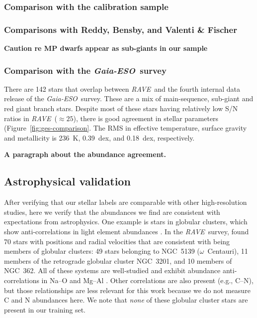 \documentclass[preprint,trackchanges]{aastex}
\newcommand{\acronym}[1]{{\small{#1}}}
\newcommand{\project}[1]{\textsl{#1}}
\newcommand{\rave}{\project{\acronym{RAVE}}}
\newcommand{\ges}{\project{Gaia-ESO}}
\newcommand{\stub}[1]{{\color{blue} \textbf{#1}}}
\begin{document}
\subsubsection{Comparison with the \citet{Kordopatis_2013} calibration sample}
\label{sec:validation-kordopatis}

\subsubsection{Comparisons with Reddy, Bensby, and Valenti \& Fischer}
\label{sec:validation-gold-standards}

\stub{Caution re MP dwarfs appear as sub-giants in our sample}

\subsubsection{Comparison with the \ges\ survey}
\label{sec:validation-ges}

There are 142 stars that overlap between \rave\ and the fourth internal
data release of the \ges\ survey. These are a mix of main-sequence, 
sub-giant and red giant branch stars.  Despite most of these stars having
relatively low S/N ratios in \rave\ ($\approx 25$), there is good 
agreement in stellar parameters (Figure~\ref{fig:ges-comparison}.  
The RMS in effective temperature, surface gravity and metallicity is
236~K, 0.39~dex, and 0.18~dex, respectively. 

\stub{A paragraph about the abundance agreement.}



\subsection{Astrophysical validation}
\label{sec:astrophysical-validation}


After verifying that our stellar labels are comparable with other
high-resolution studies, here we verify that the abundances we find
are consistent with expectations from astrophysics.  One example is stars in
globular clusters, which show anti-correlations in light element abundances 
\citep[e.g.,][and references therein]{Norris_Da_Costa_1995,Carretta_2009}.  In the \rave\
survey, \cite{Anguiano_2015} found 70 stars with positions and radial velocities that are
consistent with being members of globular clusters: 49 stars belonging to NGC~5139 ($\omega$~Centauri), 11 members of the retrograde
globular cluster NGC~3201, and 10 members of NGC~362.  
All of these systems are well-studied and exhibit abundance anti-correlations 
in Na--O and Mg--Al \citep{Marino_2011,Carretta_2009,Carretta_2013,Munoz_2013}.  Other correlations are also present 
(e.g., C--N), but those relationships are less relevant for this work because 
we do not measure C and N abundances here.  We note that \emph{none} of these 
globular cluster stars are present in our training set.
\end{document}
